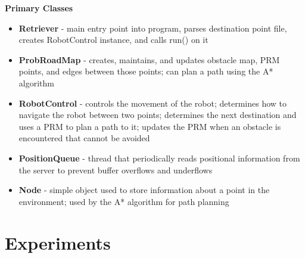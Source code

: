 \documentclass[12pt]{article}
\begin{document}
\textbf{Primary Classes}
\begin{itemize}
\item{\textbf{Retriever} - main entry point into program, parses destination point file, creates RobotControl instance, and calls run() on it}
\item{\textbf{ProbRoadMap} - creates, maintains, and updates obstacle map, PRM points, and edges between those points; 
                       can plan a path using the A* algorithm}
\item{\textbf{RobotControl} - controls the movement of the robot; determines how to navigate the robot between two points; 
                      determines the next destination and uses a PRM to plan a path to it; updates the PRM when an obstacle is encountered 
                      that cannot be avoided}
\item{\textbf{PositionQueue} - thread that periodically reads positional information from the server to prevent buffer overflows and underflows}
\item{\textbf{Node} - simple object used to store information about a point in the environment; used by the A* algorithm for path planning}
\end{itemize}


\section{Experiments}
\end{document}

